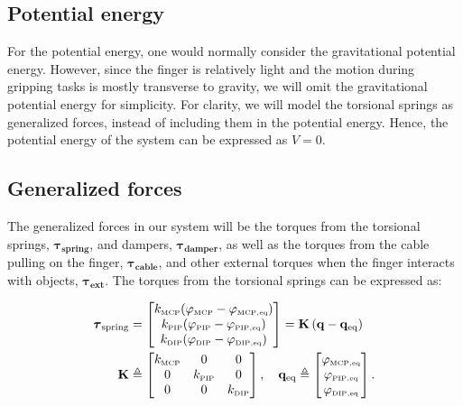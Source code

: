 \subsection{Potential energy}

For the potential energy, one would normally consider the gravitational potential energy. However, since the finger is relatively light and the motion during gripping tasks is mostly transverse to gravity, we will omit the gravitational potential energy for simplicity. For clarity, we will model the torsional springs as generalized forces, instead of including them in the potential energy. Hence, the potential energy of the system can be expressed as $V = 0$.

\subsection{Generalized forces}

The generalized forces in our system will be the torques from the torsional springs, $\boldsymbol{\tau_{\text{spring}}}$, and dampers, $\boldsymbol{\tau_{\text{damper}}}$, as well as the torques from the cable pulling on the finger, $\boldsymbol{\tau_{\text{cable}}}$, and other external torques when the finger interacts with objects, $\boldsymbol{\tau_{\text{ext}}}$. The torques from the torsional springs can be expressed as:

\begin{equation}
    \label{eq:modelling_spring_torques}
    \begin{aligned}
        \boldsymbol{\tau}_{\text{spring}} &= 
        \begin{bmatrix}
            k_{{\scriptscriptstyle\mathrm{MCP}}}(\varphi_{{\scriptscriptstyle\mathrm{MCP}}} - \varphi_{{\scriptscriptstyle\mathrm{MCP, eq}}}) \\
            k_{{\scriptscriptstyle\mathrm{PIP}}}(\varphi_{{\scriptscriptstyle\mathrm{PIP}}} - \varphi_{{\scriptscriptstyle\mathrm{PIP, eq}}}) \\
            k_{{\scriptscriptstyle\mathrm{DIP}}}(\varphi_{{\scriptscriptstyle\mathrm{DIP}}} - \varphi_{{\scriptscriptstyle\mathrm{DIP, eq}}})
        \end{bmatrix} 
        = \mathbf{K} \left(\mathbf{q} - \mathbf{q}_{\text{eq}}\right) \\ 
        \mathbf{K} &\triangleq 
        \begin{bmatrix}
            k_{{\scriptscriptstyle\mathrm{MCP}}} & 0 & 0 \\
            0 & k_{{\scriptscriptstyle\mathrm{PIP}}} & 0 \\
            0 & 0 & k_{{\scriptscriptstyle\mathrm{DIP}}}
        \end{bmatrix}, 
        \quad \mathbf{q}_{\text{eq}} \triangleq 
        \begin{bmatrix}
            \varphi_{{\scriptscriptstyle\mathrm{MCP, eq}}} \\
            \varphi_{{\scriptscriptstyle\mathrm{PIP, eq}}} \\
            \varphi_{{\scriptscriptstyle\mathrm{DIP, eq}}}
        \end{bmatrix}.
    \end{aligned}
\end{equation}

